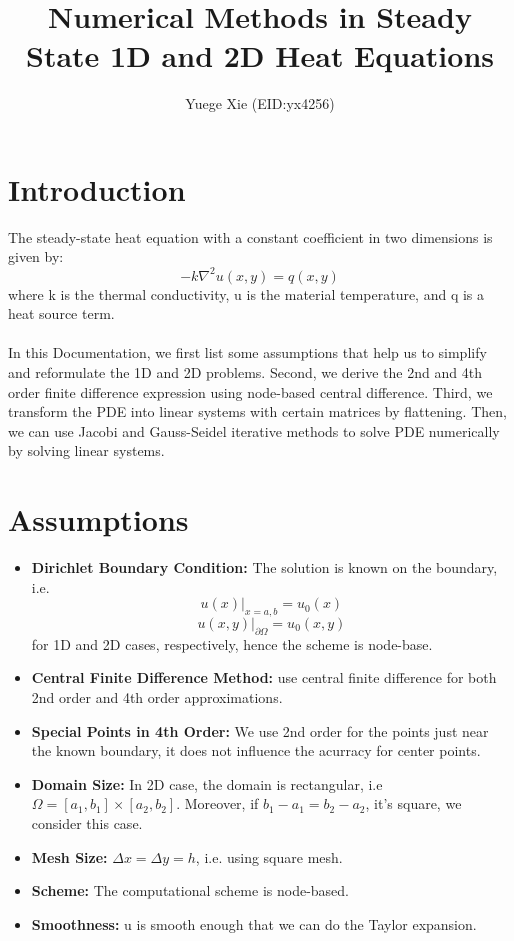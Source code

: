\documentclass[a4paper]{article}
\title{Numerical Methods in Steady State 1D and 2D Heat Equations}
\author{Yuege Xie (EID:yx4256)}
\date{}
\begin{document}
\maketitle
\tableofcontents

\newpage
\section{Introduction}
\label{sec:introduction}

The steady-state heat equation with a constant coefficient in two dimensions is given by:
$$-k\nabla^2u(x,y) = q(x,y)$$
where k is the thermal conductivity, u is the material temperature, and q is a heat source term.\\\\
In this Documentation, we first list some assumptions that help us to simplify and reformulate the 1D and 2D problems. Second, we derive the 2nd and 4th order finite difference expression using node-based central difference. Third, we transform the PDE into linear systems with certain matrices by flattening. Then, we can use Jacobi and Gauss-Seidel iterative methods to solve PDE numerically by solving linear systems. 

\section{Assumptions}
\begin{itemize}
    \item \textbf{Dirichlet Boundary Condition:} The solution is known on the boundary, i.e.
    $$ u(x)|_{x=a,b} = u_0(x)$$
    $$u(x,y)|_{\partial\Omega} = u_0(x,y)$$
    for 1D and 2D cases, respectively, hence the scheme is node-base.
    \item \textbf{Central Finite Difference Method:} use central finite difference for both 2nd order and 4th order approximations.
    \item \textbf{Special Points in 4th Order:} We use 2nd order for the points just near the known boundary, it does not influence the acurracy for center points.
    \item \textbf{Domain Size:} In 2D case, the domain is rectangular, i.e $\Omega = [a_1,b_1] \times [a_2,b_2]$. Moreover, if $b_1-a_1 = b_2-a_2$, it's square, we consider this case.
    \item \textbf{Mesh Size:} $\Delta x = \Delta y = h$, i.e. using square mesh.
    \item \textbf{Scheme:} The computational scheme is node-based.
    \item \textbf{Smoothness:} u is smooth enough that we can do the Taylor expansion.
\end{itemize}
\end{document}
